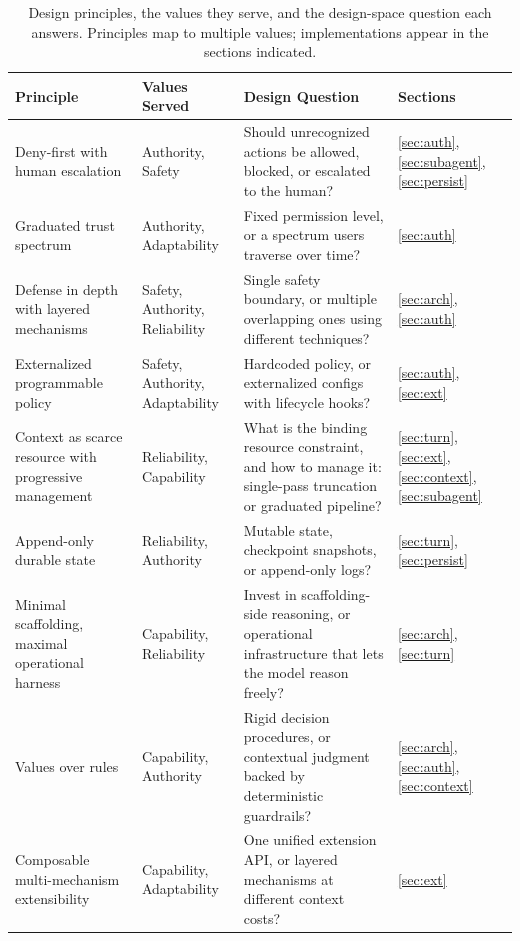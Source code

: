 \begin{table}[t]
\centering
\small
\caption{Design principles, the values they serve, and the design-space question each answers. Principles map to multiple values; implementations appear in the sections indicated.}
\label{tab:principles}
\begin{tabularx}{\textwidth}{@{}>{\raggedright\arraybackslash}m{3.8cm}>{\raggedright\arraybackslash}m{3.2cm}>{\raggedright\arraybackslash}X>{\centering\arraybackslash}m{1.2cm}@{}}
\toprule
\textbf{Principle} & \textbf{Values Served} & \textbf{Design Question} & \textbf{Sections} \\
\midrule
Deny-first with human escalation & Authority, Safety & Should unrecognized actions be allowed, blocked, or escalated to the human? & \ref{sec:auth}, \ref{sec:subagent}, \ref{sec:persist} \\
\midrule
Graduated trust spectrum & Authority, Adaptability & Fixed permission level, or a spectrum users traverse over time? & \ref{sec:auth} \\
\midrule
Defense in depth with layered mechanisms & Safety, Authority, Reliability & Single safety boundary, or multiple overlapping ones using different techniques? & \ref{sec:arch}, \ref{sec:auth} \\
\midrule
Externalized programmable policy & Safety, Authority, Adaptability & Hardcoded policy, or externalized configs with lifecycle hooks? & \ref{sec:auth}, \ref{sec:ext} \\
\midrule
Context as scarce resource with progressive management & Reliability, Capability & What is the binding resource constraint, and how to manage it: single-pass truncation or graduated pipeline? & \ref{sec:turn}, \ref{sec:ext}, \ref{sec:context}, \ref{sec:subagent} \\
\midrule
Append-only durable state & Reliability, Authority & Mutable state, checkpoint snapshots, or append-only logs? & \ref{sec:turn}, \ref{sec:persist} \\
\midrule
Minimal scaffolding, maximal operational harness & Capability, Reliability & Invest in scaffolding-side reasoning, or operational infrastructure that lets the model reason freely? & \ref{sec:arch}, \ref{sec:turn} \\
\midrule
Values over rules & Capability, Authority & Rigid decision procedures, or contextual judgment backed by deterministic guardrails? & \ref{sec:arch}, \ref{sec:auth}, \ref{sec:context} \\
\midrule
Composable multi-mechanism extensibility & Capability, Adaptability & One unified extension API, or layered mechanisms at different context costs? & \ref{sec:ext} \\

\end{tabularx}
\end{table}
